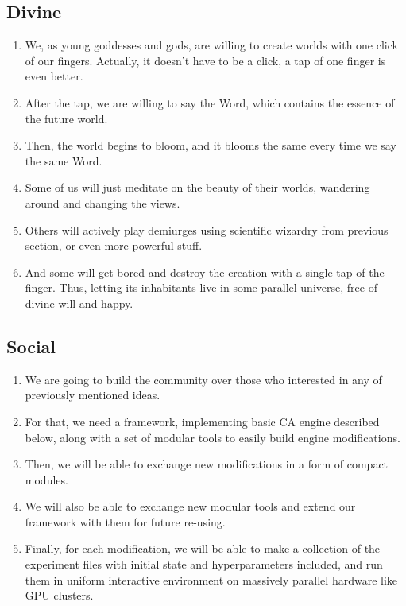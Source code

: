 \documentclass[a4paper,12pt,tikz,UTF8]{article}
\begin{document}
  \subsection{Divine}

  \begin{enumerate}
    \item We, as young goddesses and gods, are willing to create worlds with one click of our fingers. Actually, it doesn't have to be a click, a tap of one finger is even better.
    \item After the tap, we are willing to say the Word, which contains the essence of the future world.
    \item Then, the world begins to bloom, and it blooms the same every time we say the same Word.
    \item Some of us will just meditate on the beauty of their worlds, wandering around and changing the views.
    \item Others will actively play demiurges using scientific wizardry from previous section, or even more powerful stuff.
    \item And some will get bored and destroy the creation with a single tap of the finger. Thus, letting its inhabitants live in some parallel universe, free of divine will and happy.
  \end{enumerate}

  \subsection{Social}

  \begin{enumerate}
    \item We are going to build the community over those who interested in any of previously mentioned ideas.
    \item For that, we need a framework, implementing basic CA engine described below, along with a set of modular tools to easily build engine modifications.
    \item Then, we will be able to exchange new modifications in a form of compact modules.
    \item We will also be able to exchange new modular tools and extend our framework with them for future re-using.
    \item Finally, for each modification, we will be able to make a collection of the experiment files with initial state and hyperparameters included, and run them in uniform interactive environment on massively parallel hardware like GPU clusters.
  \end{enumerate}
\end{document}
